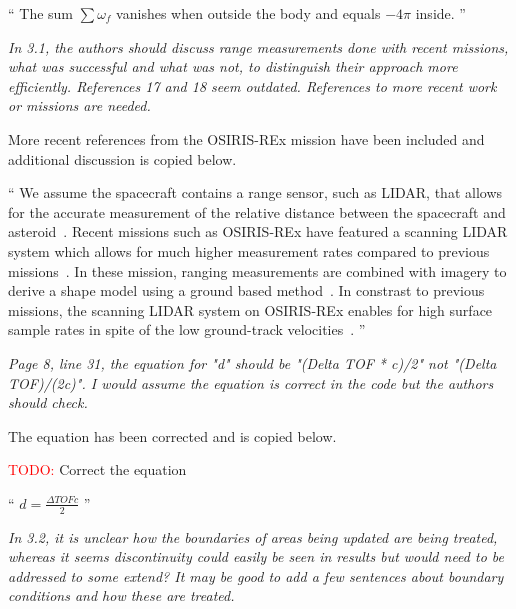 \documentclass[11pt]{article}
\newcommand{\todo}{{\large \textcolor{red}{TODO: }}}
\newenvironment{correction}{\begin{list}{}{\setlength{\leftmargin}{1cm}\setlength{\rightmargin}{1cm}}\vspace{\parsep}\item[]``}{''\end{list}}
\newcommand{\comment}[1]{\item \itshape #1 \normalfont}
\begin{document}
\begin{itemize}
\begin{correction}
    The sum \( \sum \omega_f \) vanishes when outside the body and equals \( -4 \pi \) inside.
\end{correction}

\comment{
In 3.1, the authors should discuss range measurements done with recent missions, what was successful and what was not, to distinguish their approach more efficiently. 
References 17 and 18 seem outdated. 
References to more recent work or missions are needed.
}

More recent references from the OSIRIS-REx mission have been included and additional discussion is copied below.

\begin{correction}
We assume the spacecraft contains a range sensor, such as LIDAR, that allows for the accurate measurement of the relative distance between the spacecraft and asteroid~\cite{zuber1997,zuber2000}.
Recent missions such as OSIRIS-REx have featured a scanning LIDAR system which allows for much higher measurement rates compared to previous missions~\cite{lauretta2017,daly2017}.
In these mission, ranging measurements are combined with imagery to derive a shape model using a ground based method~\cite{gaskell2008}.
In constrast to previous missions, the scanning LIDAR system on OSIRIS-REx enables for high surface sample rates in spite of the low ground-track velocities~\cite{daly2017}.
\end{correction}

\comment{
Page 8, line 31, the equation for "d" should be "(Delta TOF * c)/2" not "(Delta TOF)/(2c)". I would assume the equation is correct in the code but the authors should check.
}

The equation has been corrected and is copied below.

\todo Correct the equation

\begin{correction}
    \(d = \frac{\Delta TOF c}{2} \) 
\end{correction}

\comment{
In 3.2, it is unclear how the boundaries of areas being updated are being treated, whereas it seems discontinuity could easily be seen in results but would need to be addressed to some extend? 
It may be good to add a few sentences about boundary conditions and how these are treated.
}


\end{itemize}
\end{document}
